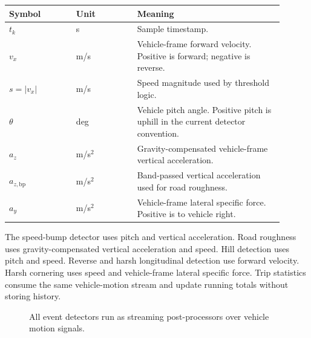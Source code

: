 \documentclass[11pt]{article}
\newcommand{\abs}[1]{\left|#1\right|}
\begin{document}
\begin{longtable}{>{\raggedright\arraybackslash}p{0.22\linewidth} >{\raggedright\arraybackslash}p{0.20\linewidth} >{\raggedright\arraybackslash}p{0.48\linewidth}}
\toprule
\textbf{Symbol} & \textbf{Unit} & \textbf{Meaning} \\
\midrule
\(t_k\) & s & Sample timestamp. \\
\(v_x\) & m/s & Vehicle-frame forward velocity. Positive is forward; negative is reverse. \\
\(s=\abs{v_x}\) & m/s & Speed magnitude used by threshold logic. \\
\(\theta\) & deg & Vehicle pitch angle. Positive pitch is uphill in the current detector convention. \\
\(a_z\) & m/s\(^2\) & Gravity-compensated vehicle-frame vertical acceleration. \\
\(a_{z,\mathrm{bp}}\) & m/s\(^2\) & Band-passed vertical acceleration used for road roughness. \\
\(a_y\) & m/s\(^2\) & Vehicle-frame lateral specific force. Positive is to vehicle right. \\
\bottomrule
\end{longtable}

The speed-bump detector uses pitch and vertical acceleration. Road roughness
uses gravity-compensated vertical acceleration and speed. Hill detection uses
pitch and speed. Reverse and harsh longitudinal detection use forward velocity.
Harsh cornering uses speed and vehicle-frame lateral specific force. Trip
statistics consume the same vehicle-motion stream and update running totals
without storing history.

\begin{figure}[h]
\centering
\vspace{0.4cm}
\caption{All event detectors run as streaming post-processors over vehicle
motion signals.}
\end{figure}
\end{document}
